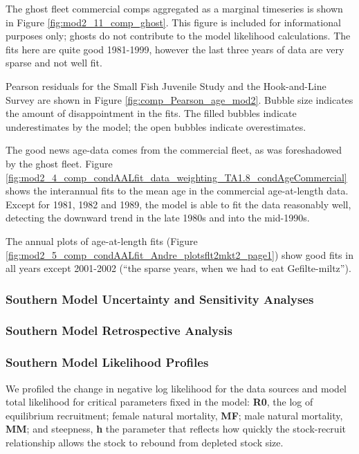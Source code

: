 \documentclass[12pt,]{article}
\begin{document}
The ghost fleet commercial comps aggregated as a marginal timeseries is
shown in Figure \ref{fig:mod2_11_comp_ghost}. This figure is included
for informational purposes only; ghosts do not contribute to the model
likelihood calculations. The fits here are quite good 1981-1999, however
the last three years of data are very sparse and not well fit.

Pearson residuals for the Small Fish Juvenile Study and the
Hook-and-Line Survey are shown in Figure
\ref{fig:comp_Pearson_age_mod2}. Bubble size indicates the amount of
disappointment in the fits. The filled bubbles indicate underestimates
by the model; the open bubbles indicate overestimates.

The good news age-data comes from the commercial fleet, as was
foreshadowed by the ghost fleet. Figure
\ref{fig:mod2_4_comp_condAALfit_data_weighting_TA1.8_condAgeCommercial}
shows the interannual fits to the mean age in the commercial
age-at-length data. Except for 1981, 1982 and 1989, the model is able to
fit the data reasonably well, detecting the downward trend in the late
1980s and into the mid-1990s.

The annual plots of age-at-length fits (Figure
\ref{fig:mod2_5_comp_condAALfit_Andre_plotsflt2mkt2_page1}) show good
fits in all years except 2001-2002 (``the sparse years, when we had to
eat Gefilte-miltz'').

\subsubsection{Southern Model Uncertainty and Sensitivity
Analyses}\label{southern-model-uncertainty-and-sensitivity-analyses}

\subsubsection{Southern Model Retrospective
Analysis}\label{southern-model-retrospective-analysis}

\subsubsection{Southern Model Likelihood
Profiles}\label{southern-model-likelihood-profiles}

We profiled the change in negative log likelihood for the data sources
and model total likelihood for critical parameters fixed in the model:
\textbf{R0}, the log of equilibrium recruitment; female natural
mortality, \textbf{MF}; male natural mortality, \textbf{MM}; and
steepness, \textbf{h} the parameter that reflects how quickly the
stock-recruit relationship allows the stock to rebound from depleted
stock size.
\end{document}
